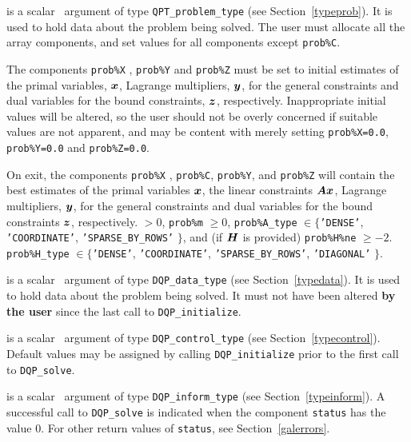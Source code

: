 \documentclass{galahad}
\newcommand{\packagename}{DQP}
\begin{document}
\begin{description}
 is a scalar \intentinout\ argument of type
{\tt QPT\_problem\_type}
(see Section~\ref{typeprob}).
It is used to hold data about the problem being solved.
The user must allocate all the array components,
and set values for all components  except {\tt prob\%C}.

The components {\tt prob\%X} , {\tt prob\%Y} and {\tt prob\%Z}
must be set to initial estimates of the primal variables, ${\bm{x}}$,
Lagrange multipliers, ${\bm{y}}$, for the general constraints
and dual variables for the bound constraints, ${\bm{z}}$, respectively.
Inappropriate initial values will be altered, so the user should
not be overly concerned if suitable values are not apparent, and may be
content with merely setting {\tt prob\%X=0.0}, {\tt prob\%Y=0.0}
and {\tt prob\%Z=0.0}.

On exit, the components {\tt prob\%X} , {\tt prob\%C}, {\tt prob\%Y},
and {\tt prob\%Z}
will contain the best estimates of the primal variables ${\bm{x}}$,
the linear constraints ${\bm{A}} {\bm{x}}$,
Lagrange multipliers, ${\bm{y}}$, for the general constraints
and dual variables for the bound constraints ${\bm{z}}$, respectively.
 $> 0$, {\tt prob\%m} $\geq 0$,
 {\tt prob\%A\_type} $\in \{${\tt 'DENSE'},
 {\tt 'COORDINATE'}, {\tt 'SPARSE\_BY\_\-ROWS'} $\}$,
              and (if ${\bm{H}}$ is provided) {\tt prob\%H\%ne} $\geq -2$.
 {\tt prob\%H\_type} $\in \{${\tt 'DENSE'},
 {\tt 'COORDINATE'}, {\tt 'SPARSE\_BY\_\-ROWS'}, {\tt 'DIAGONAL'} $\}$.

 is a scalar \intentinout\ argument of type
{\tt \packagename\_data\_type}
(see Section~\ref{typedata}). It is used to hold data about the problem being
solved. It must not have been altered {\bf by the user} since the last call to
{\tt \packagename\_initialize}.

 is a scalar \intentin\ argument of type
{\tt \packagename\_control\_type}
(see Section~\ref{typecontrol}). Default values may be assigned by calling
{\tt \packagename\_initialize} prior to the first call to
{\tt \packagename\_solve}.

 is a scalar \intentinout\ argument of type
{\tt \packagename\_inform\_type}
(see Section~\ref{typeinform}).
A successful call to
{\tt \packagename\_solve}
is indicated when the  component {\tt status} has the value 0.
For other return values of {\tt status}, see Section~\ref{galerrors}.


\end{description}
\end{document}
